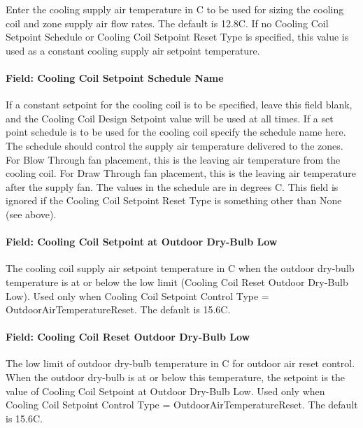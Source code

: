Enter the cooling supply air temperature in C to be used for sizing the cooling coil and zone supply air flow rates. The default is 12.8C. If no Cooling Coil Setpoint Schedule or Cooling Coil Setpoint Reset Type is specified, this value is used as a constant cooling supply air setpoint temperature.

\paragraph{Field: Cooling Coil Setpoint Schedule Name}\label{field-cooling-coil-setpoint-schedule-name-2}

If a constant setpoint for the cooling coil is to be specified, leave this field blank, and the Cooling Coil Design Setpoint value will be used at all times. If a set point schedule is to be used for the cooling coil specify the schedule name here. The schedule should control the supply air temperature delivered to the zones. For Blow Through fan placement, this is the leaving air temperature from the cooling coil. For Draw Through fan placement, this is the leaving air temperature after the supply fan. The values in the schedule are in degrees C. This field is ignored if the Cooling Coil Setpoint Reset Type is something other than None (see above).

\paragraph{Field: Cooling Coil Setpoint at Outdoor Dry-Bulb Low}\label{field-cooling-coil-setpoint-at-outdoor-dry-bulb-low}

The cooling coil supply air setpoint temperature in C when the outdoor dry-bulb temperature is at or below the low limit (Cooling Coil Reset Outdoor Dry-Bulb Low). Used only when Cooling Coil Setpoint Control Type = OutdoorAirTemperatureReset. The default is 15.6C.

\paragraph{Field: Cooling Coil Reset Outdoor Dry-Bulb Low}\label{field-cooling-coil-reset-outdoor-dry-bulb-low}

The low limit of outdoor dry-bulb temperature in C for outdoor air reset control. When the outdoor dry-bulb is at or below this temperature, the setpoint is the value of Cooling Coil Setpoint at Outdoor Dry-Bulb Low. Used only when Cooling Coil Setpoint Control Type = OutdoorAirTemperatureReset. The default is 15.6C.

